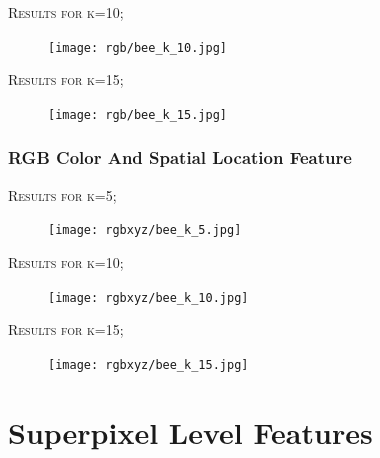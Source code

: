 \documentclass[12pt]{article}
\begin{document}
\begin{minipage}{\linewidth}
\centering
	\textsc{\large Results for k=10;}\\[0.1 cm]  
		\begin{figure} [H]
			\centering
			 \texttt{[image: rgb/bee\_k\_10.jpg]}
		\end{figure}

\end{minipage}

\begin{minipage}{\linewidth}
\centering
	\textsc{\large Results for k=15;}\\[0.1 cm]  
		\begin{figure} [H]
			\centering
			 \texttt{[image: rgb/bee\_k\_15.jpg]}
		\end{figure}
\end{minipage}



\subsubsection{RGB Color And Spatial Location Feature}
\begin{minipage}{\linewidth}
\centering
	\textsc{\large Results for k=5;}\\[0.1 cm]  
		\begin{figure} [H]
			\centering
			 \texttt{[image: rgbxyz/bee\_k\_5.jpg]}
		\end{figure}	
\end{minipage}

\begin{minipage}{\linewidth}
\centering
	\textsc{\large Results for k=10;}\\[0.1 cm]  
		\begin{figure} [H]
			\centering
			 \texttt{[image: rgbxyz/bee\_k\_10.jpg]}
		\end{figure}

\end{minipage}

\begin{minipage}{\linewidth}
\centering
	\textsc{\large Results for k=15;}\\[0.1 cm]  
		\begin{figure} [H]
			\centering
			 \texttt{[image: rgbxyz/bee\_k\_15.jpg]}
		\end{figure}
\end{minipage}


\section{Superpixel Level Features}
\end{document}
